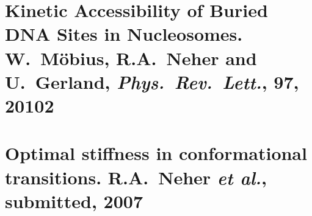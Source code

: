 \clearpage
\section[W.~M\"obius, R.A.~Neher and U.~Gerland, \emph{Phys.~Rev.~Lett.}, {\bf 97}, 20102]{Kinetic Accessibility of Buried DNA Sites in Nucleosomes. W.~M\"obius, R.A.~Neher and U.~Gerland, \emph{Phys.~Rev.~Lett.}, {\bf 97}, 20102}
\label{sec:Moebius_PRL_06}
\clearpage
\addtocounter{page}{3}
\section[R.A.~Neher \emph{et al.}, submitted, 2007]{Optimal stiffness in conformational transitions. R.A.~Neher \emph{et al.}, submitted, 2007}
\label{sec:tsr_rotor}
\clearpage
\addtocounter{page}{3}
